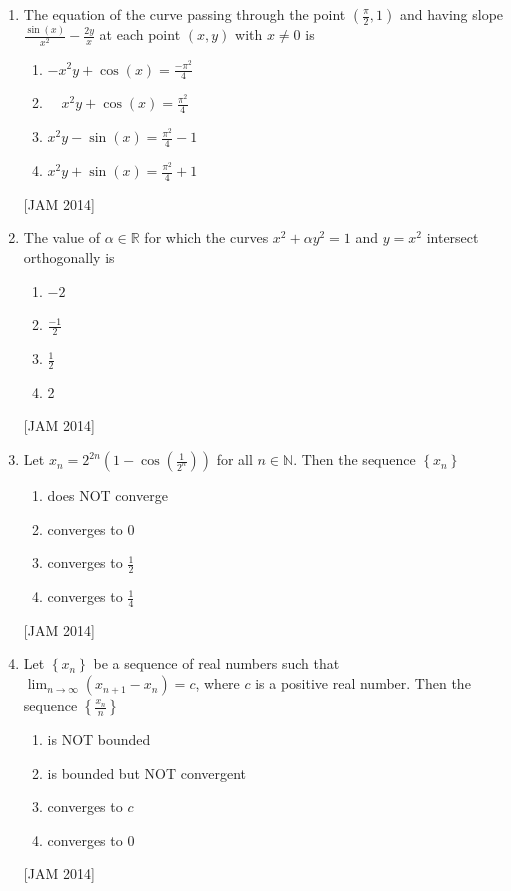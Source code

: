 \begin{enumerate}
\item  The equation of the curve passing through the point $\left(\frac{\pi}{2}, 1\right)$ and having slope $\frac{\sin (x)}{x^{2}}-\frac{2 y}{x}$ at each point $(x, y)$ with $x \neq 0$ is 


\begin{enumerate}
 \item $-x^{2} y+\cos (x)=\frac{-\pi^{2}}{4}$ 
\item $\quad x^{2} y+\cos (x)=\frac{\pi^{2}}{4}$ 
\item $x^{2} y-\sin (x)=\frac{\pi^{2}}{4}-1$ 
\item $x^{2} y+\sin (x)=\frac{\pi^{2}}{4}+1$
\end{enumerate}
\hfill [JAM 2014]



\item  The value of $\alpha \in \mathbb{R}$ for which the curves $x^{2}+\alpha y^{2}=1$ and $y=x^{2}$ intersect orthogonally is 


\begin{enumerate}
 \item $-2$ 
\item $\frac{-1}{2}$ 
\item $\frac{1}{2}$ 
\item 2
\end{enumerate}
\hfill [JAM 2014]



\item  Let $x_{n}=2^{2 n}\left(1-\cos \left(\frac{1}{2^{n}}\right)\right)$ for all $n \in \mathbb{N}$. Then the sequence $\left\{x_{n}\right\}$ 

\begin{enumerate}
 \item does NOT converge 
\item converges to 0 
\item converges to $\frac{1}{2}$ 
\item converges to $\frac{1}{4}$
\end{enumerate}
\hfill [JAM 2014]



\item  Let $\left\{x_{n}\right\}$ be a sequence of real numbers such that $\lim _{n \rightarrow \infty}\left(x_{n+1}-x_{n}\right)=c$, where $c$ is a positive real number. Then the sequence $\left\{\frac{x_{n}}{n}\right\}$ 

\begin{enumerate}
 \item is NOT bounded 
\item is bounded but NOT convergent 
\item converges to $c$ 
\item converges to 0
\end{enumerate}
\hfill [JAM 2014]


\end{enumerate}

